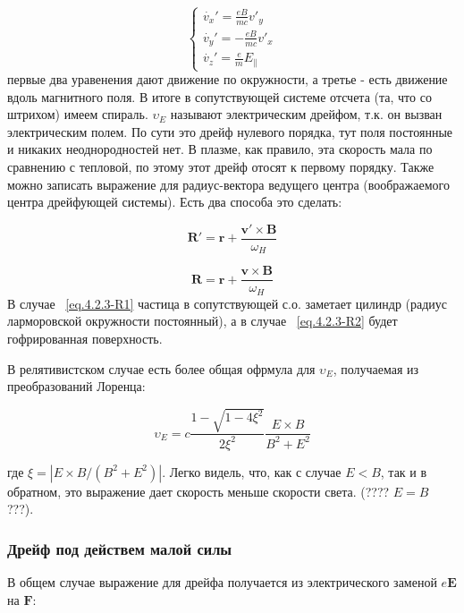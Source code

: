 \documentclass[10pt, a4paper]{article}
\begin{document}
\begin{equation}
    \begin{cases}
    \label{eq.4.2.2-motion}
    \dot{v_x}'=  \frac{eB}{mc} v'_y \\
    \dot{v_y}'= -\frac{eB}{mc} v'_x \\
    \dot{v_z}'=  \frac{e}{m} E_{\parallel}
    \end{cases}
\end{equation}
первые два уравенения дают движение по окружности, а третье - есть движение вдоль магнитного поля. В итоге в сопутствующей
системе отсчета (та, что со штрихом) имеем спираль. $\upsilon_E$ называют электрическим дрейфом, т.к. он вызван 
электрическим полем. По сути это дрейф нулевого порядка, тут поля постоянные и никаких неоднородностей нет. В плазме,
как правило, эта скорость мала по сравнению с тепловой, по этому этот дрейф отосят к первому порядку.
Также можно записать выражение для радиус-вектора ведущего центра (воображаемого центра дрейфующей системы). Есть два
способа это сделать:

\begin{equation}
    \label{eq.4.2.3-R1}
        \mathbf{R}'=\mathbf{r} + \frac{\mathbf{v}' \times \mathbf{B}}{\omega_H}
\end{equation}

\begin{equation}
    \label{eq.4.2.3-R2}
        \mathbf{R}=\mathbf{r} + \frac{\mathbf{v} \times \mathbf{B}}{\omega_H}
\end{equation}
В случае ~\ref{eq.4.2.3-R1} частица в сопутствующей с.о. заметает цилиндр (радиус ларморовской окружности постоянный), а
в случае ~\ref{eq.4.2.3-R2} будет гофрированная поверхность.

В релятивистском случае есть более общая офрмула для $\upsilon_E$, получаемая из преобразований Лоренца:

\begin{equation}
    \label{eq.4.2.4}
    \upsilon_E=c \frac{1-\sqrt{1-4\xi^2}}{2\xi^2} \frac{E \times B}{B^2 + E^2}
\end{equation}

где $\xi = |E\times B / (B^2 + E^2)|$. Легко видель, что, как с случае $E<B$, так и в обратном, это выражение дает 
скорость меньше скорости света. (???? $E=B$ ???).

\subsubsection{Дрейф под действем малой силы}
\label{sec.4.2.2}
В общем случае выражение для дрейфа получается из электрического заменой $e\mathbf{E}$ на $\mathbf{F}$:
\end{document}
